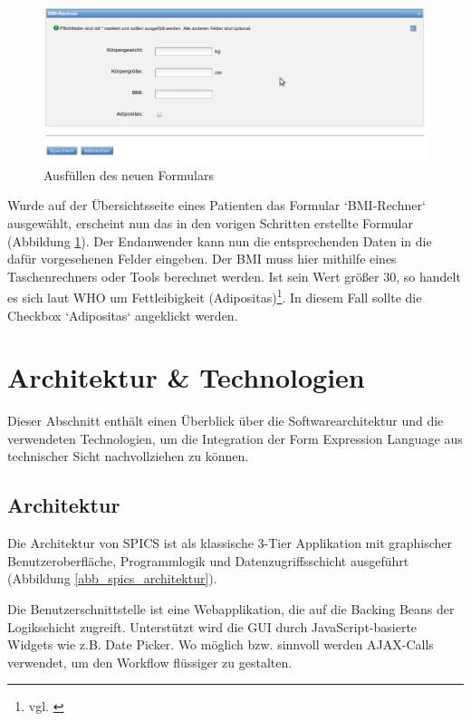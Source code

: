 \begin{figure}[h]
\begin{center}
\includegraphics[scale=0.5]{figures/workflow_formular_ausfuellen}
\caption{Ausfüllen des neuen Formulars}

\label{abb_workflow_formular_ausfuellen}
\end{center}
\end{figure}

Wurde auf der Übersichtsseite eines Patienten das Formular `BMI-Rechner` ausgewählt, erscheint nun das in den vorigen Schritten erstellte Formular (Abbildung \ref{abb_workflow_formular_ausfuellen}). Der Endanwender kann nun die entsprechenden Daten in die dafür vorgesehenen Felder eingeben. Der BMI muss hier mithilfe eines Taschenrechners oder Tools berechnet werden. Ist sein Wert größer 30, so handelt es sich laut WHO um Fettleibigkeit (Adipositas)\footnote{ vgl. \cite{Who00} }. In diesem Fall sollte die Checkbox `Adipositas` angeklickt werden.



\section{Architektur \& Technologien}

Dieser Abschnitt enthält einen Überblick über die Softwarearchitektur und die verwendeten Technologien, um die Integration der Form Expression Language aus technischer Sicht nachvollziehen zu können.


\subsection{Architektur}

Die Architektur von SPICS ist als klassische 3-Tier Applikation mit graphischer Benutzeroberfläche, Programmlogik und Datenzugriffsschicht ausgeführt (Abbildung \ref{abb_spics_architektur}). 

Die Benutzerschnittstelle ist eine Webapplikation, die auf die Backing Beans der Logikschicht zugreift. Unterstützt wird die GUI durch JavaScript-basierte Widgets wie z.B. Date Picker. Wo möglich bzw. sinnvoll werden AJAX-Calls verwendet, um den Workflow flüssiger zu gestalten.

